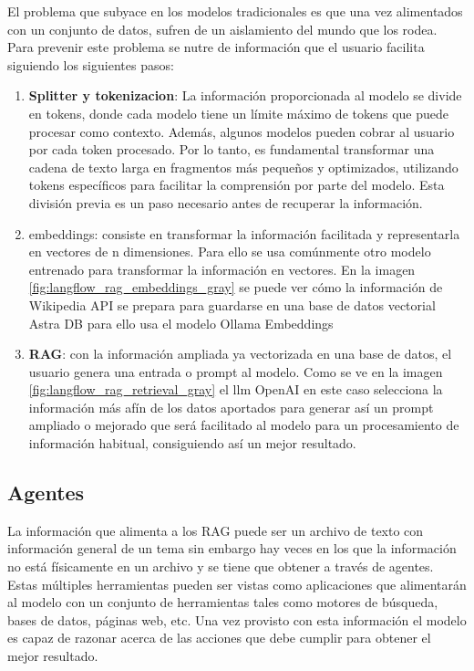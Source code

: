 	El problema que subyace en los modelos tradicionales es que una vez alimentados con un conjunto de datos, sufren de un aislamiento del mundo que los rodea. Para prevenir este problema se nutre de información que el usuario facilita siguiendo los siguientes pasos:
	\begin{enumerate}
		\item \textbf{Splitter y \gls{tokenizacion}}: La información proporcionada al modelo se divide en tokens, donde cada modelo tiene un límite máximo de tokens que puede procesar como contexto. Además, algunos modelos pueden cobrar al usuario por cada token procesado. Por lo tanto, es fundamental transformar una cadena de texto larga en fragmentos más pequeños y optimizados, utilizando tokens específicos para facilitar la comprensión por parte del modelo. Esta división previa es un paso necesario antes de recuperar la información.
	
		\item \gls{embeddings}: consiste en transformar la información facilitada y representarla en vectores de n dimensiones. Para ello se usa comúnmente otro modelo entrenado para transformar la información en vectores.
		En la imagen \ref{fig:langflow_rag_embeddings_gray} se puede ver cómo la información de Wikipedia API \cite{wikimedia_api} se prepara para guardarse en una base de datos vectorial Astra DB \cite{datastax_astra} para ello usa el modelo Ollama Embeddings
		
		
		\item \textbf{RAG}: con la información ampliada ya vectorizada en una base de datos, el usuario genera una entrada o prompt al modelo. Como se ve en la imagen \ref{fig:langflow_rag_retrieval_gray} el \acrshort{llm} OpenAI en este caso selecciona la información más afín de los datos aportados para generar así un prompt ampliado o mejorado que será facilitado al modelo para un procesamiento de información habitual, consiguiendo así un mejor resultado.
		
	\end{enumerate}
		
	\subsection{Agentes}
	\label{sec:agentes}
	La información que alimenta a los RAG puede ser un archivo de texto con información general de un tema sin embargo hay veces en los que la información no está físicamente en un archivo y se tiene que obtener a través de \gls{agentes}.
	Estas múltiples herramientas pueden ser vistas como aplicaciones que alimentarán al modelo con un conjunto de herramientas tales como motores de búsqueda, bases de datos, páginas web, etc. Una vez provisto con esta información el modelo es capaz de razonar acerca de las acciones que debe cumplir para obtener el mejor resultado.

